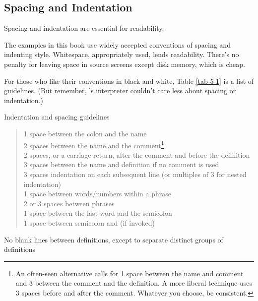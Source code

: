 \subsection{Spacing and Indentation}%

\begin{tip}
Spacing and indentation are essential for readability.
\end{tip}
The examples in this book use widely accepted conventions of spacing
and indenting style.  Whitespace, appropriately used, lends
readability.  There's no penalty for leaving space in source screens
except disk memory, which is cheap.

For those who like their conventions in black and white, Table
\ref{tab-5-1} is a list of guidelines.  (But remember, \Forth{}'s
interpreter couldn't care less about spacing or indentation.)

\begin{table}[bbbb]
\caption{Indentation and spacing guidelines}
\label{tab-5-1}
\medskip\blackline{0pt}\medskip
\begin{minipage}{\textwidth}
\begin{quote}
1 space between the colon and the name\\
2 spaces between the name and the comment\footnote{An often-seen
alternative calls for 1 space between the name and comment and 3
between the comment and the definition.  A more liberal technique uses
3 spaces before and after the comment.  Whatever you choose, be
consistent.}\\
2 spaces, or a carriage return, after the comment and
before the definition\footnotemark[1]\\
3 spaces between the name and definition if no comment is used\\
3 spaces indentation on each subsequent line (or multiples
of 3 for nested indentation)\\
1 space between words/numbers within a phrase\\
2 or 3 spaces between phrases\\
1 space between the last word and the semicolon\\
1 space between semicolon and  (if invoked)
\end{quote}
No blank lines between definitions, except to separate distinct groups
of definitions

\end{minipage}
\medskip\blackline{0pt}
\end{table}

